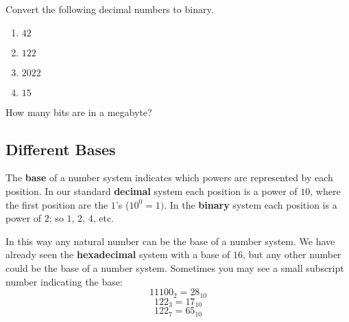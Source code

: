 \documentclass[11pt,a4paper]{report}
\newcommand{\bfb}[1]{{\bf \color{blue} #1}}
\begin{document}
\begin{ex}
Convert the following decimal numbers to binary.
\begin{multicols}{4}
\begin{enumerate}
\item $42$
\item $122$
\item $2022$
\item $15$
\end{enumerate}
\end{multicols} 
\end{ex}

\begin{ex}
How many bits are in a megabyte?
\end{ex}

\subsection{Different Bases}
The \bfb{base} of a number system indicates which powers are represented by each position. In our standard \bfb{decimal} system each position is a power of $10$, where the first position are the $1$'s ($10^0=1)$.  In the \bfb{binary} system each position is a power of $2$; so $1$, $2$, $4$, etc.

In this way any natural number can be the base of a number system. We have already seen the \bfb{hexadecimal} system with a base of $16$, but any other number could be the base of a number system. Sometimes you may see a small subscript number indicating the base:
\[
11100_{2} = 28_{10}
\]
\[
122_{3}=17_{10}
\]
\[
122_{7} = 65_{10}
\]
\end{document}
